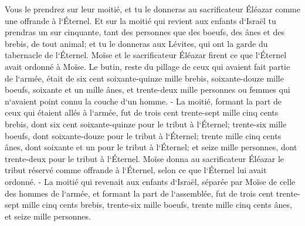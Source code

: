 \verse Vous le prendrez sur leur moitié, et tu le donneras au sacrificateur Éléazar comme une offrande à l`Éternel. 
\verse Et sur la moitié qui revient aux enfants d`Israël tu prendras un sur cinquante, tant des personnes que des boeufs, des ânes et des brebis, de tout animal; et tu le donneras aux Lévites, qui ont la garde du tabernacle de l`Éternel. 
\verse Moïse et le sacrificateur Éléazar firent ce que l`Éternel avait ordonné à Moïse. 
\verse Le butin, reste du pillage de ceux qui avaient fait partie de l`armée, était de six cent soixante-quinze mille brebis, 
\verse soixante-douze mille boeufs, 
\verse soixante et un mille ânes, 
\verse et trente-deux mille personnes ou femmes qui n`avaient point connu la couche d`un homme. - 
\verse La moitié, formant la part de ceux qui étaient allés à l`armée, fut de trois cent trente-sept mille cinq cents brebis, 
\verse dont six cent soixante-quinze pour le tribut à l`Éternel; 
\verse trente-six mille boeufs, dont soixante-douze pour le tribut à l`Éternel; 
\verse trente mille cinq cents ânes, dont soixante et un pour le tribut à l`Éternel; 
\verse et seize mille personnes, dont trente-deux pour le tribut à l`Éternel. 
\verse Moïse donna au sacrificateur Éléazar le tribut réservé comme offrande à l`Éternel, selon ce que l`Éternel lui avait ordonné. - 
\verse La moitié qui revenait aux enfants d`Israël, séparée par Moïse de celle des hommes de l`armée, 
\verse et formant la part de l`assemblée, fut de trois cent trente-sept mille cinq cents brebis, 
\verse trente-six mille boeufs, 
\verse trente mille cinq cents ânes, 
\verse et seize mille personnes. 
